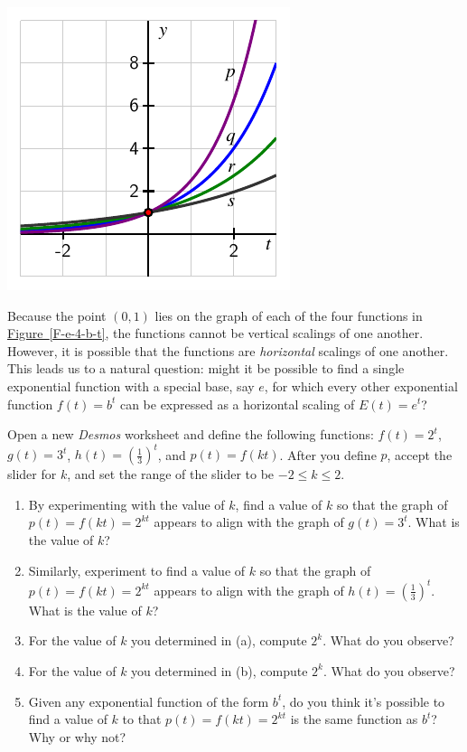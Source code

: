 \documentclass[nooutcomes]{ximera}
\begin{document}
\begin{image}
\includegraphics{e-base-compression.pdf}
\end{image}
Because the point $(0,1)$ lies on the graph of each of the four functions in \hyperref[F-e-4-b-t]{Figure~\ref{F-e-4-b-t}}, the functions cannot be vertical scalings of one another.  However, it is possible that the functions are \emph{horizontal} scalings of one another.  This leads us to a natural question:  might it be possible to find a single exponential function with a special base, say $e$, for which every other exponential function $f(t) = b^t$ can be expressed as a horizontal scaling of $E(t) = e^t$?

\begin{exploration}
Open a new \emph{Desmos} worksheet and define the following functions: $f(t) = 2^t$, $g(t) = 3^t$, $h(t) = \left(\frac{1}{3}\right)^t$, and $p(t) = f(kt)$.  After you define $p$, accept the slider for $k$, and set the range of the slider to be $-2 \le k \le 2$.
\begin{enumerate}[label=\alph*.]
\item By experimenting with the value of $k$, find a value of $k$ so that the graph of $p(t) = f(kt) = 2^{kt}$ appears to align with the graph of $g(t) = 3^t$.   What is the value of $k$?
\item Similarly, experiment to find a value of $k$ so that the graph of $p(t) = f(kt) = 2^{kt}$ appears to align with the graph of $h(t) = (\frac{1}{3})^t$.   What is the value of $k$?
\item For the value of $k$ you determined in (a), compute $2^k$.  What do you observe?
\item For the value of $k$ you determined in (b), compute $2^k$.  What do you observe?
\item Given any exponential function of the form $b^t$, do you think it's possible to find a value of $k$ to that $p(t) = f(kt) = 2^{kt}$ is the same function as $b^t$?  Why or why not?
\end{enumerate}

\end{exploration}
\end{document}
